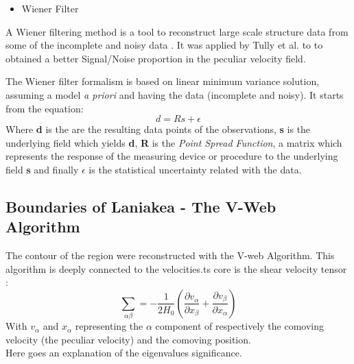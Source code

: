 \documentclass[12pt]{article}
\begin{document}
\begin{itemize}
\item Wiener Filter
\end{itemize}
\begin{par}
A Wiener filtering method is a tool to reconstruct
 large scale structure data from some of the incomplete
  and noisy data \cite{zaroubi_wiener_1995}. It  was
   applied by Tully et al. \cite{tully_laniakea_2014}
    to  to obtained a better Signal/Noise proportion in
     the peculiar velocity field.  \\
\end{par}

\begin{par}
The Wiener filter formalism is based on linear minimum
 variance solution, assuming a model \textit{a priori}
  and having the data (incomplete and noisy). It starts
   from the equation: 
  \[
  d = R s + \epsilon
  \]
  Where \textbf{d} is the are the resulting data
   points of the observations,  \textbf{s} is the
    underlying field which yields \textbf{d},
     \textbf{R} is the \textit{Point Spread
      Function}, a matrix which represents the response
       of the measuring device or procedure to the
        underlying field \textbf{s} and finally
         \textbf{ $\epsilon$ } is the statistical
          uncertainty related with the data.\\
\end{par}





\subsection{Boundaries of Laniakea - The V-Web Algorithm}
\label{sec:v_web}
The contour of the region were reconstructed with
 the V-web Algorithm. 
This algorithm is deeply
  connected to the velocities.ts core is the
   shear velocity tensor \cite{hoffman_kinematic_2012}:\\
\[
\sum_{\alpha\beta} = -\frac{1}{2 H_0} \left( \frac{\partial v_{\alpha}}{\partial x_{\beta}} + \frac{\partial v_{\beta}}{\partial x_{\alpha}} \right)
\]
With $v_{\alpha}$ and $x_{\alpha}$ representing the $\alpha$ component of respectively the comoving velocity (the peculiar velocity) and the comoving position.  \\

Here goes an explanation of the eigenvalues significance.
\end{document}
